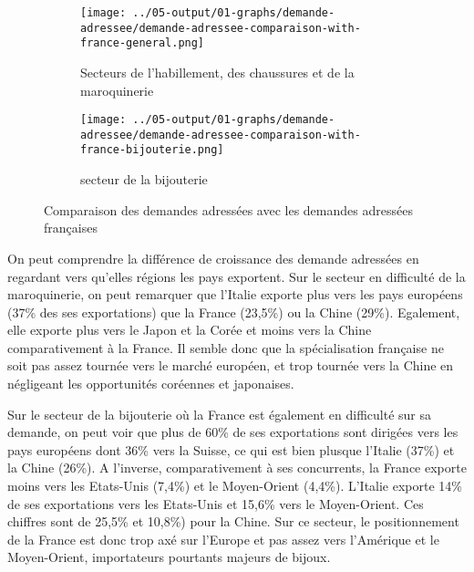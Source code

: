 \documentclass[french,10pt,a4paper]{article}
\begin{document}
\begin{figure}[!h]
  \centering
  \begin{subfigure}{\textwidth}
    \centering    \texttt{[image: ../05-output/01-graphs/demande-adressee/demande-adressee-comparaison-with-france-general.png]}
    \caption{Secteurs de l'habillement, des chaussures et de la maroquinerie}
    \label{fig:demande-adressee-comparaison-with-france-general}
  \end{subfigure}
  \vspace{0.5cm}
  \begin{subfigure}{\textwidth}
    \centering \texttt{[image: ../05-output/01-graphs/demande-adressee/demande-adressee-comparaison-with-france-bijouterie.png]}
 \caption{secteur de la bijouterie}
 \label{fig:demande-adressee-comparaison-with-france-bijouterie}
  \end{subfigure}
  \caption{Comparaison des demandes adressées avec les demandes adressées françaises}
  \label{fig:demande-adressee}
\end{figure}

\medskip
On peut comprendre la différence de croissance des demande adressées en regardant vers qu'elles régions les pays exportent. Sur le secteur en difficulté de la maroquinerie, on peut remarquer que l'Italie exporte plus vers les pays européens (37\% des ses exportations) que la France (23,5\%) ou la Chine (29\%). Egalement, elle exporte plus vers le Japon et la Corée et moins vers la Chine comparativement à la France. Il semble donc que la spécialisation française ne soit pas assez tournée vers le marché européen, et trop tournée vers la Chine en négligeant les opportunités coréennes et japonaises. 

Sur le secteur de la bijouterie où la France est également en difficulté sur sa demande, on peut voir que plus de 60\% de ses exportations sont dirigées vers les pays européens dont 36\% vers la Suisse, ce qui est bien plusque l'Italie (37\%) et la Chine (26\%). A l'inverse, comparativement à ses concurrents, la France exporte moins vers les Etats-Unis (7,4\%) et le Moyen-Orient (4,4\%). L'Italie exporte 14\% de ses exportations vers les Etats-Unis et 15,6\% vers le Moyen-Orient. Ces chiffres sont de 25,5\% et 10,8\%) pour la Chine. Sur ce secteur, le positionnement de la France est donc trop axé sur l'Europe et pas assez vers l'Amérique et le Moyen-Orient, importateurs pourtants majeurs de bijoux.
\end{document}
